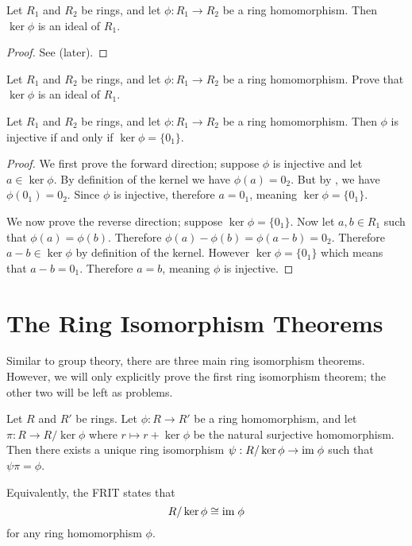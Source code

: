 \begin{proposition}\label{prop-kernel-is-an-ideal}
    Let $R_1$ and $R_2$ be rings, and let $\phi: R_1 \to R_2$ be a ring homomorphism. Then $\ker\phi$ is an ideal of $R_1$.
\end{proposition}
\begin{proof}
    See  (later).
\end{proof}
\begin{exercise}\label{exercise-kernel-is-an-ideal}
    Let $R_1$ and $R_2$ be rings, and let $\phi: R_1 \to R_2$ be a ring homomorphism. Prove that $\ker\phi$ is an ideal of $R_1$.
\end{exercise}

\begin{proposition}
    Let $R_1$ and $R_2$ be rings, and let $\phi: R_1 \to R_2$ be a ring homomorphism. Then $\phi$ is injective if and only if $\ker\phi = \{0_1\}$.
\end{proposition}
\begin{proof}
    We first prove the forward direction; suppose $\phi$ is injective and let $a \in \ker\phi$. By definition of the kernel we have $\phi(a) = 0_2$. But by , we have $\phi(0_1) = 0_2$. Since $\phi$ is injective, therefore $a = 0_1$, meaning $\ker\phi = \{0_1\}$.

    We now prove the reverse direction; suppose $\ker\phi = \{0_1\}$. Now let $a,b \in R_1$ such that $\phi(a) = \phi(b)$. Therefore $\phi(a) - \phi(b) = \phi(a-b) = 0_2$. Therefore $a-b \in \ker\phi$ by definition of the kernel. However $\ker\phi = \{0_1\}$ which means that $a - b = 0_1$. Therefore $a = b$, meaning $\phi$ is injective.
\end{proof}

\section{The Ring Isomorphism Theorems}
Similar to group theory, there are three main ring isomorphism theorems. However, we will only explicitly prove the first ring isomorphism theorem; the other two will be left as problems.

\begin{theorem}\label{thrm-ring-isomorphism-1}
    Let $R$ and $R'$ be rings. Let $\phi: R \to R'$ be a ring homomorphism, and let $\pi: R \to R/\ker\phi$ where $r\mapsto r + \ker\phi$ be the natural surjective homomorphism. Then there exists a unique ring isomorphism $\psi: R / \ker\phi \to \mathrm{im}\;\phi$ such that $\psi\pi = \phi$.
\end{theorem}
\begin{remark}
    Equivalently, the FRIT states that
    \[
        R / \ker\phi \cong \mathrm{im}\;\phi
    \]
    for any ring homomorphism $\phi$.
\end{remark}

